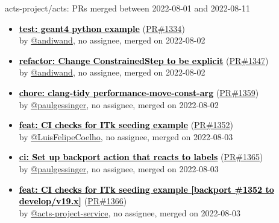\begin{frame}[allowframebreaks]{ acts-project/acts: PRs merged 
between 2022-08-01 and 2022-08-11
}
\begin{itemize}
    \item\prmerged
    \hspace*{0.1em}
    \textbf{\href{https://github.com/acts-project/acts/pull/1334}{\textcolor{black}{test: geant4 python example}}}
    (\href{https://github.com/acts-project/acts/pull/1334}{PR\#1334}) \\
    by \href{https://github.com/andiwand}{@andiwand}, {}no assignee, merged on 2022-08-02

    \item\prmerged
    \hspace*{0.1em}
    \textbf{\href{https://github.com/acts-project/acts/pull/1347}{\textcolor{black}{refactor: Change ConstrainedStep to be explicit}}}
    (\href{https://github.com/acts-project/acts/pull/1347}{PR\#1347}) \\
    by \href{https://github.com/andiwand}{@andiwand}, {}no assignee, merged on 2022-08-02

    \item\prmerged
    \hspace*{0.1em}
    \textbf{\href{https://github.com/acts-project/acts/pull/1359}{\textcolor{black}{chore: clang-tidy performance-move-const-arg}}}
    (\href{https://github.com/acts-project/acts/pull/1359}{PR\#1359}) \\
    by \href{https://github.com/paulgessinger}{@paulgessinger}, {}no assignee, merged on 2022-08-02

    \item\prmerged
    \hspace*{0.1em}
    \textbf{\href{https://github.com/acts-project/acts/pull/1352}{\textcolor{black}{feat: CI checks for ITk seeding example}}}
    (\href{https://github.com/acts-project/acts/pull/1352}{PR\#1352}) \\
    by \href{https://github.com/LuisFelipeCoelho}{@LuisFelipeCoelho}, {}no assignee, merged on 2022-08-03

    \item\prmerged
    \hspace*{0.1em}
    \textbf{\href{https://github.com/acts-project/acts/pull/1365}{\textcolor{black}{ci: Set up backport action that reacts to labels}}}
    (\href{https://github.com/acts-project/acts/pull/1365}{PR\#1365}) \\
    by \href{https://github.com/paulgessinger}{@paulgessinger}, {}no assignee, merged on 2022-08-03

    \item\prmerged
    \hspace*{0.1em}
    \textbf{\href{https://github.com/acts-project/acts/pull/1366}{\textcolor{black}{feat: CI checks for ITk seeding example [backport \#1352 to develop/v19.x]}}}
    (\href{https://github.com/acts-project/acts/pull/1366}{PR\#1366}) \\
    by \href{https://github.com/acts-project-service}{@acts-project-service}, {}no assignee, merged on 2022-08-03


\end{itemize}
\end{frame}
